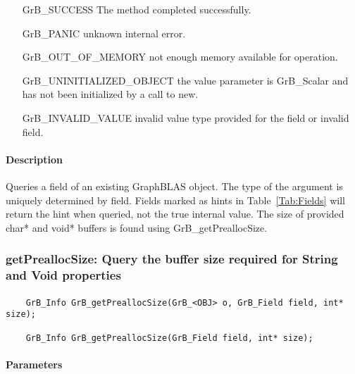 \begin{itemize}[leftmargin=2.1in]
\item[{\sf GrB\_SUCCESS}]  The method completed successfully.
\item[{\sf GrB\_PANIC}]             unknown internal error.
\item[{\sf GrB\_OUT\_OF\_MEMORY}]          not enough memory available for operation.
\item[{\sf GrB\_UNINITIALIZED\_OBJECT}]          the {\sf value} parameter is {\sf GrB\_Scalar} and has not been
                                    initialized by a call to {\sf new}.
\item[{\sf GrB\_INVALID\_VALUE}]    invalid value type provided for the field or invalid field.
\end{itemize}

\paragraph{Description}

Queries a field of an existing GraphBLAS object.
The type of the argument is uniquely determined by {\sf field}. 
Fields marked as hints in Table~\ref{Tab:Fields} will return the hint when queried, not
the true internal value. The size of provided {\sf char*} and {\sf void*} buffers
is found using {\sf GrB\_getPreallocSize}.

\subsubsection{{\sf getPreallocSize}: Query the buffer size required for String and Void properties}

\paragraph{\syntax}

\begin{verbatim}
    GrB_Info GrB_getPreallocSize(GrB_<OBJ> o, GrB_Field field, int* size);

    GrB_Info GrB_getPreallocSize(GrB_Field field, int* size);
\end{verbatim}

\paragraph{Parameters}

